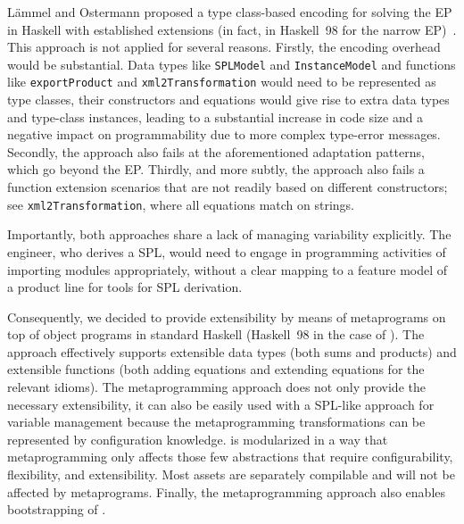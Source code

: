 L\"ammel and Ostermann proposed a type class-based encoding for
solving the EP in Haskell with established extensions (in fact, in
Haskell~98 for the narrow EP)~\cite{LaemmelO06}. This approach is not
applied for several reasons. Firstly, the encoding overhead would be
substantial. Data types like \texttt{SPLModel} and
\texttt{InstanceModel} and functions like \texttt{exportProduct} and
\texttt{xml2Transformation} would need to be represented as type
classes, their constructors and equations would give rise to extra
data types and type-class instances, leading to a substantial increase
in code size and a negative impact on programmability due to more
complex type-error messages. Secondly, the approach also fails at the
aforementioned adaptation patterns, which go beyond the EP. Thirdly,
and more subtly, the approach also fails a function extension
scenarios that are not readily based on different constructors; see 
\texttt{xml2Transformation}, where all equations match on strings.

Importantly, both approaches share a lack of managing variability
explicitly. The engineer, who derives a SPL, would need to engage in
programming activities of importing modules appropriately, without a
clear mapping to a feature model of a product line for tools for SPL
derivation.

Consequently, we decided to provide extensibility by means of
metaprograms on top of object programs in standard Haskell (Haskell~98
in the case of \hpl). The approach effectively supports extensible
data types (both sums and products) and extensible functions (both
adding equations and extending equations for the relevant idioms).
The metaprogramming approach does not only provide the necessary
extensibility, it can also be easily used with a SPL-like approach for
variable management because the metaprogramming transformations can be
represented by configuration knowledge. \hpl{} is modularized in a way
that metaprogramming only affects those few abstractions that require
configurability, flexibility, and extensibility. Most assets are
separately compilable and will not be affected by metaprograms.
Finally, the metaprogramming approach also enables bootstrapping of
\hpl.

